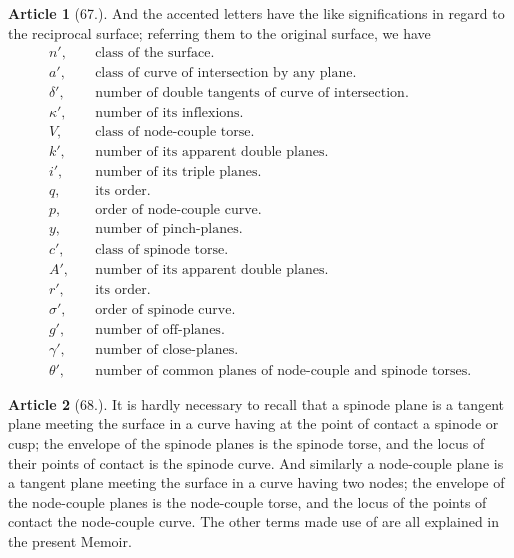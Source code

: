\documentclass[11pt,a4paper]{article}
\theoremstyle{definition}
\newtheorem{art}{Article}
\begin{document}
\begin{art}[67.]
And the accented letters have the like significations in regard to the reciprocal surface; referring them to the original surface, we have
\begin{align*}
n', &\quad \text{class of the surface.} \\
a', &\quad \text{class of curve of intersection by any plane.} \\
\delta', &\quad \text{number of double tangents of curve of intersection.} \\
\kappa', &\quad \text{number of its inflexions.} \\
V, &\quad \text{class of node-couple torse.} \\
k', &\quad \text{number of its apparent double planes.} \\
i', &\quad \text{number of its triple planes.} \\
q, &\quad \text{its order.} \\
p, &\quad \text{order of node-couple curve.} \\
y, &\quad \text{number of pinch-planes.} \\
c', &\quad \text{class of spinode torse.} \\
A', &\quad \text{number of its apparent double planes.} \\
r', &\quad \text{its order.} \\
\sigma', &\quad \text{order of spinode curve.} \\
g', &\quad \text{number of off-planes.} \\
\gamma', &\quad \text{number of close-planes.} \\
\theta', &\quad \text{number of common planes of node-couple and spinode torses.}
\end{align*}
\end{art}

\begin{art}[68.]
It is hardly necessary to recall that a spinode plane is a tangent plane meeting the surface in a curve having at the point of contact a spinode or cusp; the envelope of the spinode planes is the spinode torse, and the locus of their points of contact is the spinode curve. And similarly a node-couple plane is a tangent plane meeting the surface in a curve having two nodes; the envelope of the node-couple planes is the node-couple torse, and the locus of the points of contact the node-couple curve. The other terms made use of are all explained in the present Memoir.
\end{art}
\end{document}
